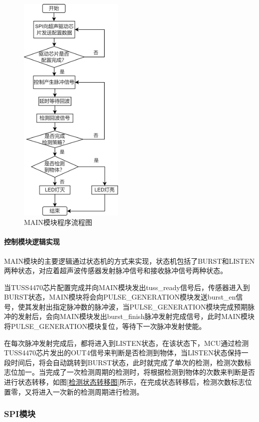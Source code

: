     \begin{figure}[ht]
        \centering
        \includegraphics[width=5cm]{figure/MAIN module flow chart.png}
        \caption{MAIN模块程序流程图}
        \label{MAIN模块程序流程图}
    \end{figure}
    
     \noindent
   \paragraph{控制模块逻辑实现}
    MAIN模块的主要逻辑通过状态机的方式来实现，状态机包括了BURST和LISTEN两种状态，对应着超声波传感器发射脉冲信号和接收脉冲信号两种状态。
    
    当TUSS4470芯片配置完成并向MAIN模块发出tuss\_ready信号后，传感器进入到BURST状态，MAIN模块将会向PULSE\_GENERATION模块发送burst\_en信号，使其发射出指定脉冲数的脉冲波，当PULSE\_GENERATION模块完成预期脉冲的发射后，会向MAIN模块发出burst\_finish脉冲发射完成信号，此时MAIN模块将PULSE\_GENERATION模块复位，等待下一次脉冲发射使能。
    
    在每次脉冲发射完成后，都将进入到LISTEN状态，在该状态下，MCU通过检测TUSS4470芯片发出的OUT4信号来判断是否检测到物体，当LISTEN状态保持一段时间后，将会自动跳转到BURST状态，此时就完成了单次的检测，检测次数标志位加一。当完成了一次检测周期的检测时，将根据检测到物体的次数来判断是否进行状态转移，如图\ref{检测状态转移图}所示，在完成状态转移后，检测次数标志位置零，又将进入一次新的检测周期进行检测。
       
    \subsubsection{SPI模块}
	\noindent
